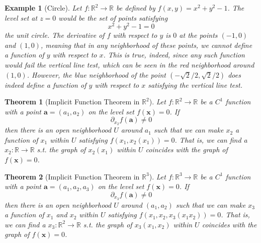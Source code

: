 \documentclass{article}
\newtheorem{theorem}{Theorem}[section]
\newtheorem{example}{Example}[section]
\theoremstyle{remark}
\theoremstyle{definition}
\begin{document}
\begin{example}[Circle]
Let $f: \mathbb{R}^2 \longrightarrow \mathbb{R}$ be defined by $f(x, y) = x^2 + y^2 - 1$. The level set at $z = 0$ would be the set of points satisfying 
\[x^2 + y^2 - 1 = 0\]
the unit circle. The derivative of $f$ with respect to $y$ is $0$ at the points $(-1,0)$ and $(1,0)$, meaning that in any neighborhood of these points, we cannot define a function of $y$ with respect to $x$. This is true, indeed, since any such function would fail the vertical line test, which can be seen in the red neighborhood around $(1,0)$. However, the blue neighborhood of the point $(-\sqrt{2}/2, \sqrt{2}/2)$ does indeed define a function of $y$ with respect to $x$ satisfying the vertical line test. 
\begin{center}
\end{center}
\end{example}

\begin{theorem}[Implicit Function Theorem in $\mathbb{R}^2$]
Let $f: \mathbb{R}^2 \longrightarrow \mathbb{R}$ be a $C^1$ function with a point $\mathbf{a} = (a_1, a_2)$ on the level set $f(\mathbf{x}) = 0$. If 
\[\partial_{x_2} f (\mathbf{a}) \neq 0\]
then there is an open neighborhood $U$ around $a_1$ such that we can make $x_2$ a function of $x_1$ within $U$ satisfying $f(x_1, x_2(x_1)) = 0$. That is, we can find a $x_2: \mathbb{R} \longrightarrow \mathbb{R}$ s.t. the graph of $x_2(x_1)$ within $U$ coincides with the graph of $f(\mathbf{x}) = 0$.
\end{theorem}

\begin{theorem}[Implicit Function Theorem in $\mathbb{R}^3$]
Let $f: \mathbb{R}^3 \longrightarrow \mathbb{R}$ be a $C^1$ function with a point $\mathbf{a} = (a_1, a_2, a_3)$ on the level set $f(\mathbf{x}) = 0$. If 
\[\partial_{x_3} f (\mathbf{a}) \neq 0\]
then there is an open neighborhood $U$ around $(a_1, a_2)$ such that we can make $x_3$ a function of $x_1$ and $x_2$ within $U$ satisfying $f(x_1, x_2, x_3(x_1 x_2)) = 0$. That is, we can find a $x_3: \mathbb{R}^2 \longrightarrow \mathbb{R}$ s.t. the graph of $x_3(x_1, x_2)$ within $U$ coincides with the graph of $f(\mathbf{x}) = 0$.
\end{theorem}
\end{document}
